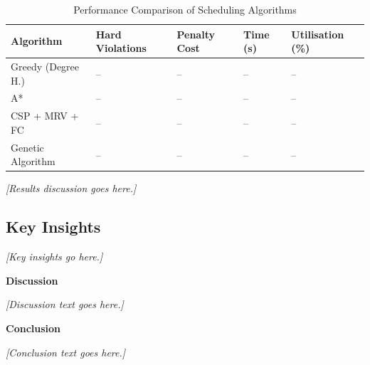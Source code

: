 \begin{table}[H]
  \centering
  \caption{Performance Comparison of Scheduling Algorithms}
  \label{tab:results}
  \begin{tabularx}{\linewidth}{lXXXX}
    \toprule
    \textbf{Algorithm}    & \textbf{Hard Violations}
                          & \textbf{Penalty Cost}
                          & \textbf{Time (s)}
                          & \textbf{Utilisation (\%)} \\
    \midrule
    Greedy (Degree H.)    & -- & -- & -- & -- \\
    A*                    & -- & -- & -- & -- \\
    CSP + MRV + FC        & -- & -- & -- & -- \\
    Genetic Algorithm     & -- & -- & -- & -- \\
    \bottomrule
  \end{tabularx}
\end{table}

\noindent\textit{[Results discussion goes here.]}

\subsection{Key Insights}
\noindent\textit{[Key insights go here.]}

\newpage
{}
{}
{\large\bfseries Discussion}
\vspace{2pt}
\titlerule
\vspace{6pt}

\noindent\textit{[Discussion text goes here.]}

\vspace{10pt}
{}
{\large\bfseries Conclusion}
\vspace{2pt}
\titlerule
\vspace{6pt}

\noindent\textit{[Conclusion text goes here.]}

\newpage
\printbibliography[heading=bibintoc, title={References}]

\newpage
\appendix
\renewcommand{\thesection}{Appendix \Alph{section}}

